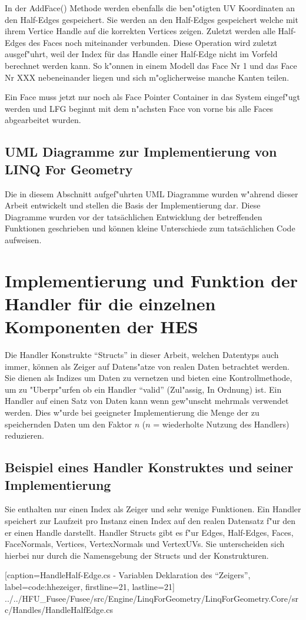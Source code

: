 \documentclass[pagesize, paper=a4, fontsize=12pt,titlepage=true, headings=small, headnosepline, abstractoff, liststotoc, nochapterprefix, plainheadsepline]{scrreprt}
\newcommand{\LFG}{LINQ For Geometry}
\begin{document}
In der AddFace() Methode werden ebenfalls die ben"otigten UV Koordinaten an den Half-Edges gespeichert. Sie werden an den Half-Edges gespeichert welche mit ihrem Vertice Handle auf die korrekten Vertices zeigen. Zuletzt werden alle Half-Edges des Faces noch miteinander verbunden. Diese Operation wird zuletzt ausgef"uhrt, weil der Index für das Handle einer Half-Edge nicht im Vorfeld berechnet werden kann. So k"onnen in einem Modell das Face Nr 1 und das Face Nr XXX nebeneinander liegen und sich m"oglicherweise manche Kanten teilen.

Ein Face muss jetzt nur noch als Face Pointer Container in das System eingef"ugt werden und LFG beginnt mit dem n"achsten Face von vorne bis alle Faces abgearbeitet wurden.

		\subsection {UML Diagramme zur Implementierung von \LFG}
Die in diesem Abschnitt aufgef"uhrten UML Diagramme wurden w"ahrend dieser Arbeit entwickelt und stellen die Basis der Implementierung dar. Diese Diagramme wurden vor der tatsächlichen Entwicklung der betreffenden Funktionen geschrieben und können kleine Unterschiede zum tatsächlichen Code aufweisen.

	\section {Implementierung und Funktion der Handler für die einzelnen Komponenten der HES}
Die Handler Konstrukte "`Structs"' in dieser Arbeit, welchen Datentyps auch immer, können als Zeiger auf Datens"atze von realen Daten betrachtet werden. Sie dienen als Indizes um Daten zu vernetzen und bieten eine Kontrollmethode, um zu "Uberpr"urfen ob ein Handler "`valid"' (Zul"assig, In Ordnung) ist. Ein Handler auf einen Satz von Daten kann wenn gew"unscht mehrmals verwendet werden. Dies w"urde bei geeigneter Implementierung die Menge der zu speichernden Daten um den Faktor \(n\) (\(n\) = wiederholte Nutzung des Handlers) reduzieren.
		\subsection {Beispiel eines Handler Konstruktes und seiner Implementierung}
Sie enthalten nur einen Index als Zeiger und sehr wenige Funktionen. Ein Handler speichert zur Laufzeit pro Instanz einen Index auf den realen Datensatz f"ur den er einen Handle darstellt. Handler Structs gibt es f"ur Edges, Half-Edges, Faces, FaceNormals, Vertices, VertexNormals und VertexUVs. Sie unterscheiden sich hierbei nur durch die Namensgebung der Structs und der Konstrukturen.

			[caption={HandleHalf-Edge.cs - Variablen Deklaration des "`Zeigers"'}, label=code:hhezeiger, firstline=21, lastline=21]
			{../../HFU_Fusee/Fusee/src/Engine/LinqForGeometry/LinqForGeometry.Core/src/Handles/HandleHalfEdge.cs}
\end{document}
